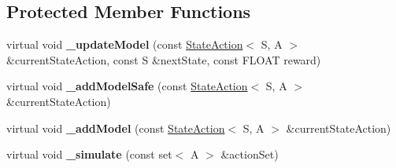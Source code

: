 \subsection*{Protected Member Functions}
\begin{DoxyCompactItemize}
\item 
\hypertarget{classAI_1_1Algorithm_1_1DynaQBase_a4a45b9303a4b9e0cf93b9a5272739b35}{virtual void {\bfseries \-\_\-update\-Model} (const \hyperlink{classAI_1_1StateAction}{State\-Action}$<$ S, A $>$ \&current\-State\-Action, const S \&next\-State, const F\-L\-O\-A\-T reward)}\label{classAI_1_1Algorithm_1_1DynaQBase_a4a45b9303a4b9e0cf93b9a5272739b35}

\item 
\hypertarget{classAI_1_1Algorithm_1_1DynaQBase_a0524b63604a75fd079b85a3a6e6ac93d}{virtual void {\bfseries \-\_\-add\-Model\-Safe} (const \hyperlink{classAI_1_1StateAction}{State\-Action}$<$ S, A $>$ \&current\-State\-Action)}\label{classAI_1_1Algorithm_1_1DynaQBase_a0524b63604a75fd079b85a3a6e6ac93d}

\item 
\hypertarget{classAI_1_1Algorithm_1_1DynaQBase_aefe879b3103a6c4f46176d9fcb1a911d}{virtual void {\bfseries \-\_\-add\-Model} (const \hyperlink{classAI_1_1StateAction}{State\-Action}$<$ S, A $>$ \&current\-State\-Action)}\label{classAI_1_1Algorithm_1_1DynaQBase_aefe879b3103a6c4f46176d9fcb1a911d}

\item 
\hypertarget{classAI_1_1Algorithm_1_1DynaQBase_ae33343ea87f96ee3a2c2651bfd2cbcc5}{virtual void {\bfseries \-\_\-simulate} (const set$<$ A $>$ \&action\-Set)}\label{classAI_1_1Algorithm_1_1DynaQBase_ae33343ea87f96ee3a2c2651bfd2cbcc5}

\end{DoxyCompactItemize}
